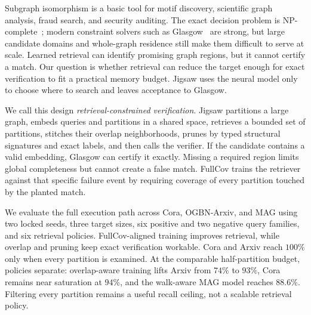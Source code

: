 \documentclass{article}
\begin{document}
Subgraph isomorphism is a basic tool for motif discovery, scientific graph analysis, fraud search, and security auditing. The exact decision problem is NP-complete~\cite{ref_garey}; modern constraint solvers such as Glasgow~\cite{ref_glasgow} are strong, but large candidate domains and whole-graph residence still make them difficult to serve at scale. Learned retrieval can identify promising graph regions, but it cannot certify a match. Our question is whether retrieval can reduce the target enough for exact verification to fit a practical memory budget. Jigsaw uses the neural model only to choose where to search and leaves acceptance to Glasgow.

We call this design \emph{retrieval-constrained verification}. Jigsaw partitions a large graph, embeds queries and partitions in a shared space, retrieves a bounded set of partitions, stitches their overlap neighborhoods, prunes by typed structural signatures and exact labels, and then calls the verifier. If the candidate contains a valid embedding, Glasgow can certify it exactly. Missing a required region limits global completeness but cannot create a false match. FullCov trains the retriever against that specific failure event by requiring coverage of every partition touched by the planted match.

We evaluate the full execution path across Cora, OGBN-Arxiv, and MAG using two locked seeds, three target sizes, six positive and two negative query families, and six retrieval policies. FullCov-aligned training improves retrieval, while overlap and pruning keep exact verification workable. Cora and Arxiv reach $100\%$ only when every partition is examined. At the comparable half-partition budget, policies separate: overlap-aware training lifts Arxiv from $74\%$ to $93\%$, Cora remains near saturation at $94\%$, and the walk-aware MAG model reaches $88.6\%$. Filtering every partition remains a useful recall ceiling, not a scalable retrieval policy.
\end{document}
